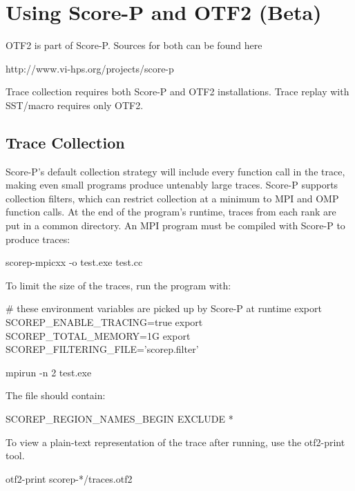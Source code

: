 
\section{Using Score-P and OTF2 (Beta)}
\label{sec:tutorial:otf}

OTF2 is part of Score-P. Sources for both can be found here 
\begin{ViFile}
http://www.vi-hps.org/projects/score-p
\end{ViFile}


Trace collection requires both Score-P and OTF2 installations. Trace replay with SST/macro requires only OTF2.


\subsection{Trace Collection}
\label{subsec:otf:traceCollection}
Score-P's default collection strategy will include every function call in the trace, making even small programs produce untenably large traces. Score-P supports collection filters, which can restrict collection at a minimum to MPI and OMP function calls. At the end of the program's runtime, traces from each rank are put in a common directory.  An MPI program must be compiled with Score-P to produce traces:

\begin{ShellCmd}
scorep-mpicxx -o test.exe test.cc
\end{ShellCmd}



To limit the size of the traces, run the program with:

\begin{ViFile}
# these environment variables are picked up by Score-P at runtime
export SCOREP_ENABLE_TRACING=true
export SCOREP_TOTAL_MEMORY=1G
export SCOREP_FILTERING_FILE='scorep.filter'

mpirun -n 2 test.exe
\end{ViFile}

The file  should contain:
\begin{ViFile}
SCOREP_REGION_NAMES_BEGIN EXCLUDE *
\end{ViFile}


To view a plain-text representation of the trace after running, use the otf2-print tool.

\begin{ViFile}
otf2-print scorep-*/traces.otf2
\end{ViFile}

